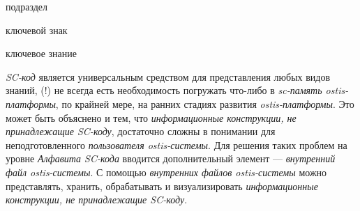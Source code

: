 \begin{SCn}

\begin{scnrelfromlist}{подраздел}
\end{scnrelfromlist}

\begin{scnrelfromlist}{ключевой знак}
\end{scnrelfromlist}

\begin{scnrelfromlist}{ключевое знание}
	\begin{scnindent}
	\end{scnindent}
\end{scnrelfromlist}

\end{SCn}

\textit{SC-код} является универсальным средством для представления любых видов знаний,  (!) не всегда есть необходимость погружать что-либо в \textit{sc-память ostis-платформы}, по крайней мере, на ранних стадиях развития \textit{ostis-платформы}. Это может быть объяснено и тем, что \textit{информационные конструкции, не принадлежащие SC-коду}, достаточно сложны в понимании для неподготовленного \textit{пользователя ostis-системы}. Для решения таких проблем на уровне \textit{Алфавита SC-кода\scnsupergroupsign} вводится дополнительный элемент --- \textit{внутренний файл ostis-системы}. С помощью \textit{внутренних файлов ostis-системы} можно представлять, хранить, обрабатывать и визуализировать \textit{информационные конструкции, не принадлежащие SC-коду}.

